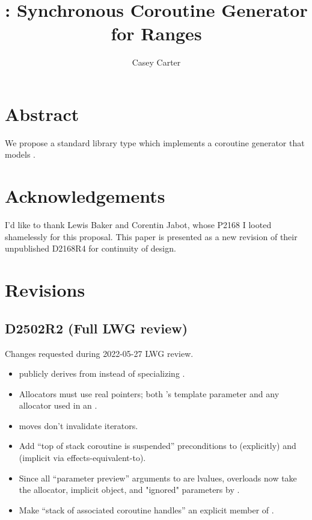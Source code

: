 \documentclass{wg21}
\title{\tcode{std::generator}: Synchronous Coroutine Generator for Ranges}
\author{Casey Carter}{Casey@Carter.net}
\begin{document}
\maketitle

\section{Abstract}

We propose a standard library type 
which implements a coroutine generator
that models .

\section{Acknowledgements}

I'd like to thank Lewis Baker and Corentin Jabot,
whose P2168 \cite{P2168R3} I looted shamelessly for this proposal.
This paper is presented as a new revision of
their unpublished D2168R4 for continuity of design.

\section{Revisions}


\subsection{D2502R2 (Full LWG review)}
Changes requested during 2022-05-27 LWG review.
\begin{itemize}
\item {} publicly derives from 
  instead of specializing .
\item Allocators must use real pointers; both
  's template parameter  and
  any allocator used in an .
\item {} moves don't invalidate iterators.
\item Add ``top of stack coroutine is suspended'' preconditions to
   (explicitly) and
   (implicit via effects-equivalent-to).
\item Since all ``parameter preview'' arguments
  to  are lvalues,
   overloads now take
  the allocator, implicit object, and "ignored" parameters
  by .
\item Make ``stack of associated coroutine handles'' an explicit
   member of .
\end{itemize}
\end{document}

